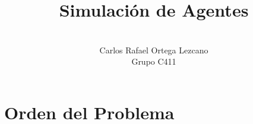 \documentclass[a4paper,10pt,twocolumn]{article}
\title{Simulaci\'on de Agentes}
\author{\\
	\name Carlos Rafael Ortega Lezcano \\ \addr Grupo C411 }
\begin{document}




\section*{Orden del Problema}
\end{document}
